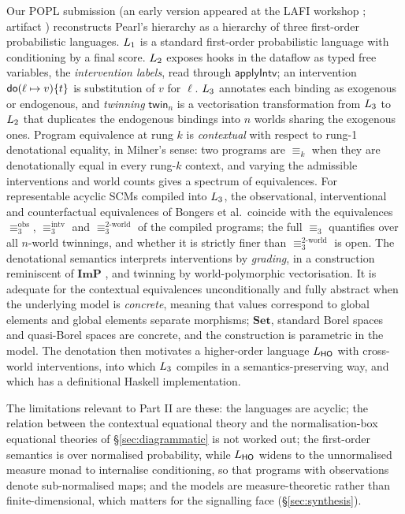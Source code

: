 Our POPL submission  (an early version appeared at the LAFI workshop \cite{lafi-wang}; artifact \cite{ARTIFACT_wang_2026_23207221}) reconstructs Pearl's hierarchy as a hierarchy of three first-order probabilistic languages. $L_{1}$ is a standard first-order probabilistic language with conditioning by a final score. $L_{2}$ exposes hooks in the dataflow as typed free variables, the \emph{intervention labels}, read through $\mathsf{applyIntv}$; an intervention $\mathsf{do}(\ell\mapsto v)\{t\}$ is substitution of $v$ for $\ell$. $L_{3}$ annotates each binding as exogenous or endogenous, and \emph{twinning} $\mathsf{twin}_n$ is a vectorisation transformation from $L_{3}$ to $L_{2}$ that duplicates the endogenous bindings into $n$ worlds sharing the exogenous ones. Program equivalence at rung $k$ is \emph{contextual} with respect to rung-1 denotational equality, in Milner's sense: two programs are $\equiv_k$ when they are denotationally equal in every rung-$k$ context, and varying the admissible interventions and world counts gives a spectrum of equivalences. For representable acyclic SCMs compiled into $L_{3}$, the observational, interventional and counterfactual equivalences of Bongers et al.\ coincide with the equivalences $\equiv_3^{\mathrm{obs}}$, $\equiv_3^{\mathrm{intv}}$ and $\equiv_3^{\text{2-world}}$ of the compiled programs; the full $\equiv_3$ quantifies over all $n$-world twinnings, and whether it is strictly finer than $\equiv_3^{\text{2-world}}$ is open. The denotational semantics interprets interventions by \emph{grading}, in a construction reminiscent of $\mathbf{ImP}$ \cite{liell2025compositional}, and twinning by world-polymorphic vectorisation. It is adequate for the contextual equivalences unconditionally and fully abstract when the underlying model is \emph{concrete}, meaning that values correspond to global elements and global elements separate morphisms; $\mathbf{Set}$, standard Borel spaces and quasi-Borel spaces are concrete, and the construction is parametric in the model. The denotation then motivates a higher-order language $L_{\mathsf{HO}}$ with cross-world interventions, into which $L_{3}$ compiles in a semantics-preserving way, and which has a definitional Haskell implementation. 

The limitations relevant to Part II are these: the languages are acyclic; the relation between the contextual equational theory and the normalisation-box equational theories of \S\ref{sec:diagrammatic} is not worked out; the first-order semantics is over normalised probability, while $L_{\mathsf{HO}}$ widens to the unnormalised measure monad to internalise conditioning, so that programs with observations denote sub-normalised maps; and the models are measure-theoretic rather than finite-dimensional, which matters for the signalling face (\S\ref{sec:synthesis}).

